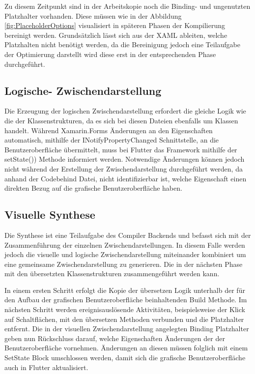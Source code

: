  

Zu diesem Zeitpunkt sind in der Arbeitskopie noch die Binding- und ungenutzten Platzhalter vorhanden.  Diese müssen wie in der Abbildung \ref{fig:PlaceholderOptions} visualisiert in späteren Phasen der Kompilierung bereinigt werden.  Grundsätzlich lässt sich aus der XAML ableiten,  welche Platzhalten nicht benötigt werden,  da die Bereinigung jedoch eine Teilaufgabe der Optimierung darstellt wird diese erst in der entsprechenden Phase durchgeführt. 

\subsection{Logische- Zwischendarstellung}

Die Erzeugung der logischen Zwischendarstellung erfordert die gleiche Logik wie die der Klassenstrukturen,  da es sich bei diesen Dateien ebenfalls um \Csharp Klassen handelt.  Während Xamarin.Forms Änderungen an den Eigenschaften automatisch, mithilfe der \glq INotifyPropertyChanged\grq{} Schnittstelle,  an die Benutzeroberfläche übermittelt, muss bei Flutter das Framework mithilfe der \glq setState())\grq{} Methode
 informiert werden.  Notwendige Änderungen können jedoch nicht während der Erstellung der Zwischendarstellung durchgeführt werden,  da anhand der Codebehind Datei,  nicht identifizierbar ist,  welche Eigenschaft einen direkten Bezug auf die grafische Benutzeroberfläche haben.

\subsection{Visuelle Synthese}

Die Synthese ist eine Teilaufgabe des Compiler Backends und befasst sich mit der Zusammenführung der einzelnen Zwischendarstellungen.  In diesem Falle werden jedoch die visuelle und logische Zwischendarstellung miteinander kombiniert um eine gemeinsame Zwischendarstellung zu generieren.  Die in der nächsten Phase mit den übersetzten Klassenstrukturen zusammengeführt werden kann. 

In einem ersten Schritt erfolgt die Kopie der übersetzen Logik unterhalb der für den Aufbau der grafischen Benutzeroberfläche beinhaltenden Build Methode.  Im nächsten Schritt werden ereignisauslösende Aktivitäten,  beispielsweise der Klick auf Schaltflächen,  mit den übersetzen Methoden verbunden und die Platzhalter entfernt.  Die in der visuellen Zwischendarstellung angelegten Binding Platzhalter geben nun Rückschluss darauf,  welche Eigenschaften Änderungen der der Benutzeroberfläche vornehmen.  Änderungen an diesen müssen folglich mit einem SetState Block umschlossen werden, damit sich die grafische Benutzeroberfläche auch in Flutter aktualisiert. 

